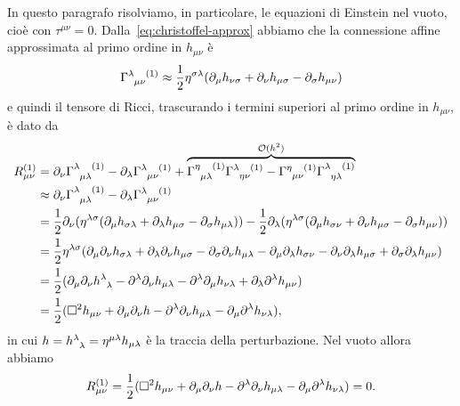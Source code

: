 In questo paragrafo risolviamo, in particolare, le equazioni di Einstein nel
vuoto, cioè con $\tau^{\mu\nu} = 0$.  Dalla~\eqref{eq:christoffel-approx}
abbiamo che la connessione affine approssimata al primo ordine in $h_{\mu\nu}$ è
\begin{equation}
  \tensor{\Gamma}{^{\lambda}_{\mu\nu}^{(1)}} \approx \frac{1}{2}\eta^{\sigma\lambda}
  (\partial_{\mu}h_{\nu\sigma} + \partial_{\nu}h_{\mu\sigma}
  - \partial_{\sigma}h_{\mu\nu})
\end{equation}
e quindi il tensore di Ricci, trascurando i termini superiori al primo ordine in
$h_{\mu\nu}$, è dato da
\begin{equation}
  \begin{split}
    R_{\mu\nu}^{(1)} &= \partial_{\nu}
    \tensor{\Gamma}{^{\lambda}_{\mu\lambda}^{(1)}}
    - \partial_{\lambda} \tensor{\Gamma}{^{\lambda}_{\mu\nu}^{(1)}} +
    \overbrace{\tensor{\Gamma}{^{\eta}_{\mu\lambda}^{(1)}}
      \tensor{\Gamma}{^{\lambda}_{\eta\nu}^{(1)}} -
      \tensor{\Gamma}{^{\eta}_{\mu\nu}^{(1)}}
      \tensor{\Gamma}{^{\lambda}_{\eta\lambda}^{(1)}}}^{\mathcal{O}(h^{2})} \\
    &\approx \partial_{\nu}\tensor{\Gamma}{^{\lambda}_{\mu\lambda}^{(1)}}
    - \partial_{\lambda} \tensor{\Gamma}{^{\lambda}_{\mu\nu}^{(1)}} \\
    &= \frac{1}{2}\partial_{\nu} (\eta^{\lambda\sigma}(\partial_{\mu}
    h_{\sigma\lambda} + \partial_{\lambda}h_{\mu\sigma}
    - \partial_{\sigma}h_{\mu\lambda})) -
    \frac{1}{2}\partial_{\lambda}(\eta^{\lambda\sigma}(\partial_{\mu}h_{\sigma\nu}
    + \partial_{\nu}h_{\mu\sigma} - \partial_{\sigma}h_{\mu\nu})) \\
    &= \frac{1}{2} \eta^{\lambda\sigma}(\partial_{\mu}\partial_{\nu}
    h_{\sigma\lambda} + \partial_{\lambda}\partial_{\nu} h_{\mu\sigma}
    - \partial_{\sigma}\partial_{\nu} h_{\mu\lambda}
    - \partial_{\mu}\partial_{\lambda} h_{\sigma\nu}
    - \partial_{\nu}\partial_{\lambda} h_{\mu\sigma}
    + \partial_{\sigma}\partial_{\lambda} h_{\mu\nu}) \\
    &= \frac{1}{2}(\partial_{\mu}\partial_{\nu}
    \tensor{h}{^{\lambda}_{\lambda}} - \partial^{\lambda}\partial_{\nu}
    h_{\mu\lambda} - \partial^{\lambda}\partial_{\mu} h_{\nu\lambda}
    + \partial_{\lambda}\partial^{\lambda} h_{\mu\nu}) \\
    &= \frac{1}{2} (\dalamb h_{\mu\nu} + \partial_{\mu}\partial_{\nu} h
    - \partial^{\lambda}\partial_{\nu} h_{\mu\lambda}
    - \partial_{\mu}\partial^{\lambda} h_{\nu\lambda}),
  \end{split}
\end{equation}
in cui $h = \tensor{h}{^{\lambda}_{\lambda}} = \eta^{\mu\lambda} h_{\mu\lambda}$
è la traccia della perturbazione.  Nel vuoto allora abbiamo
\begin{equation}
  R_{\mu\nu}^{(1)} = \frac{1}{2} (\Box^{2} h_{\mu\nu}
  + \partial_{\mu}\partial_{\nu} h - \partial^{\lambda}\partial_{\nu}
  h_{\mu\lambda} - \partial_{\mu}\partial^{\lambda} h_{\nu\lambda}) = 0.
\end{equation}

